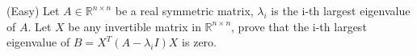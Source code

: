 \documentclass{article}
\begin{document}
(Easy) Let $A \in \mathbb{R}^{n\times n}$ be a real symmetric matrix, 
$\lambda_i$ is the i-th largest eigenvalue of $A$. Let $X$ be any invertible
matrix in $\mathbb{R}^{n\times n}$, prove that the i-th largest eigenvalue
of $B=X^T(A-\lambda_iI)X$ is zero.
\end{document}
